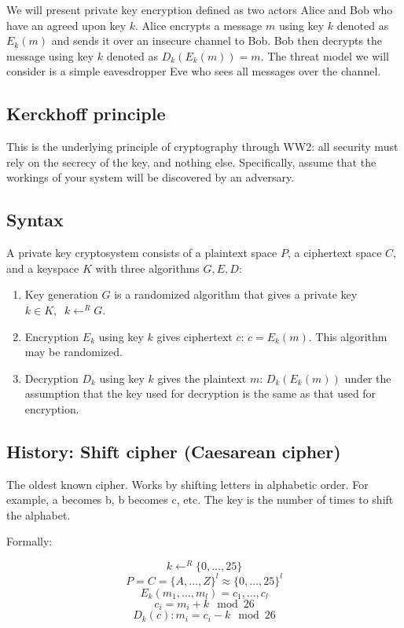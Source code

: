 \documentclass{idc_msc}
\begin{document}
We will present private key encryption defined as two actors Alice and Bob who have an agreed upon key \(k\).
Alice encrypts a message \(m\) using key \(k\) denoted as \(E_k(m)\) and sends it over an insecure channel to Bob.
Bob then decrypts the message using key \(k\) denoted as \(D_k(E_k(m)) = m\).
The threat model we will consider is a simple eavesdropper Eve who sees all messages over the channel.

\subsection{Kerckhoff principle}

This is the underlying principle of cryptography through WW2: all security must rely on the secrecy of the key, and nothing else.
Specifically, assume that the workings of your system will be discovered by an adversary.

\subsection{Syntax}

A private key cryptosystem consists of a plaintext space \(P\), a ciphertext space \(C\), and a keyspace \(K\) with three algorithms \(G, E, D\):

\begin{enumerate}
  \item Key generation \(G\) is a randomized algorithm that gives a private key \(k \in K,\;\; k \gets^R G\).
  \item Encryption \(E_k\) using key \(k\) gives ciphertext \(c\): \(c=E_k(m)\). This algorithm may be randomized.
  \item Decryption \(D_k\) using key \(k\) gives the plaintext \(m\): \(D_k(E_k(m))\) under the assumption that the key used for decryption is the same as that used for encryption.
\end{enumerate}

\subsection{History: Shift cipher (Caesarean cipher)}

The oldest known cipher.
Works by shifting letters in alphabetic order.
For example, a becomes b, b becomes c, etc.
The key is the number of times to shift the alphabet.

Formally:

\[
  k \gets^R \{0, \ldots, 25\}
\]
\[
  P = C = \{A, \ldots, Z\}^l \approx \{0, \ldots, 25\}^l
\]
\[
  E_k(m_1, \ldots, m_l) = c_1, \ldots, c_l
\]
\[
  c_i = m_i + k \mod 26
\]
\[
  D_k(c): m_i = c_i - k \mod 26
\]
\end{document}
